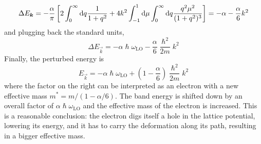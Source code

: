 \begin{equation}
    \Delta E_\vec{k} = - \frac{\alpha}{\pi} \left[
        2\int_0^\infty \differential q \frac{1}{1+q^2}
        + 4k^2 \int_{-1}^1 \differential \mu \int_0^\infty \differential q \frac{q^2\mu^2}{(1+q^2)^3} \right]
    = - \alpha - \frac{\alpha}{6}k^2
\end{equation}
and plugging back the standard units,
\begin{equation}
    \Delta E_\vec{k} = -\alpha \hslash \omega_\text{LO} - \frac{\alpha}{6}\frac{\hslash^2}{2m}k^2
\end{equation}
Finally, the perturbed energy is
\begin{equation} \label{eq:perturbation_energy}
    E_\vec{k} = -\alpha \hslash \omega_\text{LO} + \left(1 - \frac{\alpha}{6}\right)\frac{\hslash^2}{2m}k^2
\end{equation}
where the factor on the right can be interpreted as an electron with a new effective mass $m^* = m / (1-\alpha/6)$. The band energy is shifted down by an overall factor of $\alpha \hslash \omega_\text{LO}$ and the effective mass of the electron is increased. This is a reasonable conclusion: the electron digs itself a hole in the lattice potential, lowering its energy, and it has to carry the deformation along its path, resulting in a bigger effective mass.

